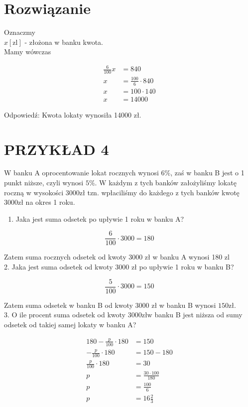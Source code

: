 \documentclass[10pt]{article}
\begin{document}
\section*{Rozwiązanie}
Oznaczmy\\
\(x[\mathrm{zl}]\) - złożona w banku kwota.\\
Mamy wówczas

\[
\begin{aligned}
\frac{6}{100} x & =840 \\
x & =\frac{100}{6} \cdot 840 \\
x & =100 \cdot 140 \\
x & =14000
\end{aligned}
\]

Odpowiedź: Kwota lokaty wynosiła 14000 zł.

\section*{PRZYKŁAD 4}
W banku A oprocentowanie lokat rocznych wynosi \(6 \%\), zaś w banku B jest o 1 punkt niższe, czyli wynosi \(5 \%\). W każdym z tych banków założyliśmy lokatę roczną w wysokości \(3000 \mathrm{zł}\) tzn. wpłaciliśmy do każdego z tych banków kwotę \(3000 \mathrm{zł}\) na okres 1 roku.

\begin{enumerate}
  \item Jaka jest suma odsetek po upływie 1 roku w banku A?
\end{enumerate}

\[
\frac{6}{100} \cdot 3000=180
\]

Zatem suma rocznych odsetek od kwoty 3000 zł w banku A wynosi 180 zl\\
2. Jaka jest suma odsetek od kwoty 3000 zł po upływie 1 roku w banku B?

\[
\frac{5}{100} \cdot 3000=150
\]

Zatem suma odsetek w banku B od kwoty 3000 zł w banku B wynosi \(150 \mathrm{zł}\).\\
3. O ile procent suma odsetek od kwoty \(3000 \mathrm{zł} \mathrm{w}\) banku B jest niższa od sumy odsetek od takiej samej lokaty w banku A?

\[
\begin{aligned}
180-\frac{p}{100} \cdot 180 & =150 \\
-\frac{p}{100} \cdot 180 & =150-180 \\
\frac{p}{100} \cdot 180 & =30 \\
p & =\frac{30 \cdot 100}{180} \\
p & =\frac{100}{6} \\
p & =16 \frac{2}{3}
\end{aligned}
\]
\end{document}

